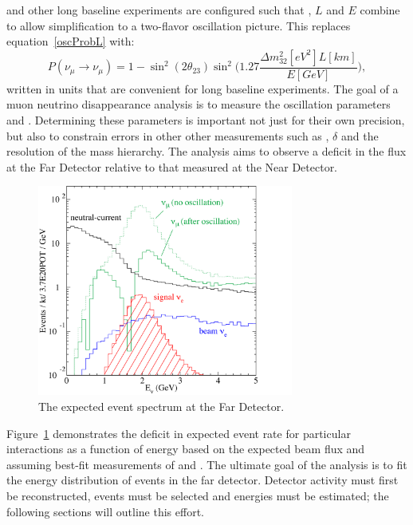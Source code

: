 \nova and other long baseline experiments are configured such that \deltamtht, $L$ and $E$ combine to allow simplification to a two-flavor oscillation picture.  This replaces equation~\eqref{oscProbL} with:
\begin{equation}\label{muSurvProb}
P(\nu_\mu \rightarrow \nu_\mu) = 1 - \sin^2(2 \theta_{23})\sin^2 \bigg( 1.27 \frac{\Delta m^2_{32}[eV^2] L[km]}{E[GeV]} \bigg ), 
\end{equation}
written in units that are convenient for long baseline experiments.  The goal of a muon neutrino disappearance analysis is to measure the oscillation parameters \thetatth and \deltamtht. Determining these parameters is important not just for their own precision, but also to constrain errors in other other measurements such as \thetaoth, $\delta$ and the resolution of the mass hierarchy.  The analysis aims to observe a deficit in the \numu flux at the Far Detector relative to that measured at the Near Detector.  
\begin{figure}[h]
\begin{center}
\includegraphics[width=0.75\textwidth]{figures/plots/nova/nuEventSpectrum.png}
\end{center}
\caption{The expected event spectrum at the \nova Far Detector.}
\label{spectrum}
\end{figure}
Figure~\ref{spectrum} demonstrates the deficit in expected event rate for particular interactions as a function of energy based on the expected beam flux and assuming best-fit measurements of \thetatth and \deltamtht.\cite{pdg}  The ultimate goal of the analysis is to fit the energy distribution of events in the far detector.  Detector activity must first be reconstructed, events must be selected and energies must be estimated; the following sections will outline this effort.



